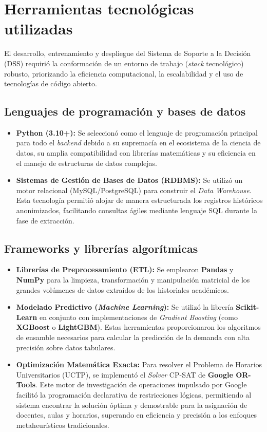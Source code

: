 \section{Herramientas tecnológicas utilizadas}
El desarrollo, entrenamiento y despliegue del Sistema de Soporte a la Decisión (DSS) requirió la conformación de un entorno de trabajo (\textit{stack} tecnológico) robusto, priorizando la eficiencia computacional, la escalabilidad y el uso de tecnologías de código abierto.

\subsection{Lenguajes de programación y bases de datos}
\begin{itemize}
    \item \textbf{Python (3.10+):} Se seleccionó como el lenguaje de programación principal para todo el \textit{backend} debido a su supremacía en el ecosistema de la ciencia de datos, su amplia compatibilidad con librerías matemáticas y su eficiencia en el manejo de estructuras de datos complejas.
    \item \textbf{Sistemas de Gestión de Bases de Datos (RDBMS):} Se utilizó un motor relacional (MySQL/PostgreSQL) para construir el \textit{Data Warehouse}. Esta tecnología permitió alojar de manera estructurada los registros históricos anonimizados, facilitando consultas ágiles mediante lenguaje SQL durante la fase de extracción.
\end{itemize}

\subsection{Frameworks y librerías algorítmicas}
\begin{itemize}
    \item \textbf{Librerías de Preprocesamiento (ETL):} Se emplearon \textbf{Pandas} y \textbf{NumPy} para la limpieza, transformación y manipulación matricial de los grandes volúmenes de datos extraídos de los historiales académicos.
    \item \textbf{Modelado Predictivo (\textit{Machine Learning}):} Se utilizó la librería \textbf{Scikit-Learn} en conjunto con implementaciones de \textit{Gradient Boosting} (como \textbf{XGBoost} o \textbf{LightGBM}). Estas herramientas proporcionaron los algoritmos de ensamble necesarios para calcular la predicción de la demanda con alta precisión sobre datos tabulares.
    \item \textbf{Optimización Matemática Exacta:} Para resolver el Problema de Horarios Universitarios (UCTP), se implementó el \textit{Solver} CP-SAT de \textbf{Google OR-Tools}. Este motor de investigación de operaciones impulsado por Google facilitó la programación declarativa de restricciones lógicas, permitiendo al sistema encontrar la solución óptima y demostrable para la asignación de docentes, aulas y horarios, superando en eficiencia y precisión a los enfoques metaheurísticos tradicionales.
\end{itemize}


